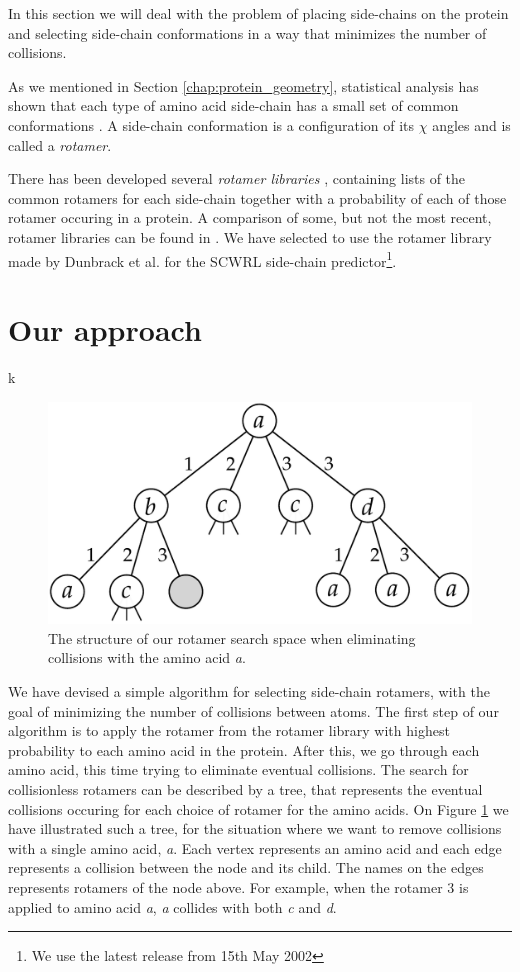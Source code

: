 In this section we will deal with the problem of placing side-chains
on the protein and selecting side-chain conformations in a way that
minimizes the number of collisions.

As we mentioned in Section \ref{chap:protein_geometry}, statistical
analysis has shown that each type of amino acid side-chain has a small
set of common conformations \cite{dunbrack2002rotamer}. A side-chain
conformation is a configuration of its $\chi$ angles and is called a
\textit{rotamer}.

There has been developed several \textit{rotamer libraries}
\cite{dunbrack1997bayesian, lovell2000penultimate}, containing lists
of the common rotamers for each side-chain together with a probability
of each of those rotamer occuring in a protein. A comparison of some,
but not the most recent, rotamer libraries can be found in
\cite{dunbrack2002rotamer}. We have selected to use the rotamer
library made by Dunbrack et al. for the SCWRL side-chain
predictor\footnote{We use the latest release from 15th May 2002}.

\section{Our approach}
k\begin{figure}
	\centering
	\includegraphics[width=.9\columnwidth]{figures/rotamersearch}
	\caption{The structure of our rotamer search space when eliminating
      collisions with the amino acid \textit{a}.}
    \label{fig:rotamer-search-tree}
\end{figure}
We have devised a simple algorithm for selecting side-chain rotamers,
with the goal of minimizing the number of collisions between
atoms. The first step of our algorithm is to apply the rotamer from the rotamer library
with highest probability to each amino acid in the protein. After
this, we go through each amino acid, this time trying to eliminate
eventual collisions. The search for collisionless rotamers can be
described by a tree, that represents the eventual collisions occuring
for each choice of rotamer for the amino acids. On Figure
\ref{fig:rotamer-search-tree} we have illustrated such a tree, for the
situation where we want to remove collisions with a single amino acid,
\textit{a}. Each vertex represents an amino acid and each edge
represents a collision between the node and its child. The names on
the edges represents rotamers of the node above. For example, when
the rotamer $3$ is applied to amino acid \textit{a}, \textit{a} collides
with both \textit{c} and \textit{d}.

